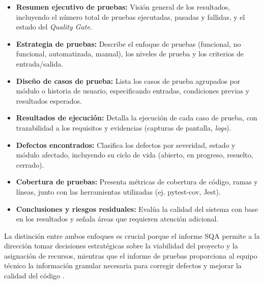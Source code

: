 \documentclass[12pt, letterpaper]{article}
\begin{document}
\begin{itemize}
    \item \textbf{Resumen ejecutivo de pruebas:} Visión general de los resultados, incluyendo el número total de pruebas ejecutadas, pasadas y fallidas, y el estado del \emph{Quality Gate}.
    \item \textbf{Estrategia de pruebas:} Describe el enfoque de pruebas (funcional, no funcional, automatizada, manual), los niveles de prueba y los criterios de entrada/salida.
    \item \textbf{Diseño de casos de prueba:} Lista los casos de prueba agrupados por módulo o historia de usuario, especificando entradas, condiciones previas y resultados esperados.
    \item \textbf{Resultados de ejecución:} Detalla la ejecución de cada caso de prueba, con trazabilidad a los requisitos y evidencias (capturas de pantalla, \emph{logs}).
    \item \textbf{Defectos encontrados:} Clasifica los defectos por severidad, estado y módulo afectado, incluyendo su ciclo de vida (abierto, en progreso, resuelto, cerrado).
    \item \textbf{Cobertura de pruebas:} Presenta métricas de cobertura de código, ramas y líneas, junto con las herramientas utilizadas (ej. pytest-cov, Jest).
    \item \textbf{Conclusiones y riesgos residuales:} Evalúa la calidad del sistema con base en los resultados y señala áreas que requieren atención adicional.
\end{itemize}

La distinción entre ambos enfoques es crucial porque el informe SQA permite a la dirección tomar decisiones estratégicas sobre la viabilidad del proyecto y la asignación de recursos, mientras que el informe de pruebas proporciona al equipo técnico la información granular necesaria para corregir defectos y mejorar la calidad del código \citep{galin2018, pressman2020}.
\end{document}
